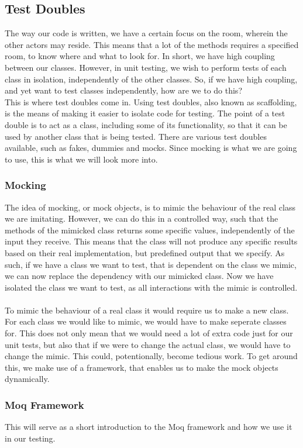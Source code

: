 \subsection{Test Doubles}
The way our code is written, we have a certain focus on the room, wherein the other actors may reside. This means that a lot of the methods requires a specified room, to know where and what to look for. In short, we have high coupling between our classes. However, in unit testing, we wish to perform tests of each class in isolation, independently of the other classes. So, if we have high coupling, and yet want to test classes independently, how are we to do this? \\ This is where test doubles come in. Using test doubles, also known as scaffolding, is the means of making it easier to isolate code for testing. The point of a test double is to act as a class, including some of its functionality, so that it can be used by another class that is being tested\cite{TestingCodeComplete}. There are various test doubles available, such as fakes, dummies and mocks. Since mocking is what we are going to use, this is what we will look more into.

\subsubsection{Mocking}
The idea of mocking, or mock objects, is to mimic the behaviour of the real class we are imitating. However, we can do this in a controlled way, such that the methods of the mimicked class returns some specific values, independently of the input they receive. This means that the class will not produce any specific results based on their real implementation, but predefined output that we specify\cite{TestingAdaptiveCode}. As such, if we have a class we want to test, that is dependent on the class we mimic, we can now replace the dependency with our mimicked class. Now we have isolated the class we want to test, as all interactions with the mimic is controlled. \\
\\
To mimic the behaviour of a real class it would require us to make a new class. For each class we would like to mimic, we would have to make seperate classes for. This does not only mean that we would need a lot of extra code just for our unit tests, but also that if we were to change the actual class, we would have to change the mimic. This could, potentionally, become tedious work. To get around this, we make use of a framework, that enables us to make the mock objects dynamically.

\subsubsection{Moq Framework}
This will serve as a short introduction to the Moq framework and how we use it in our testing.